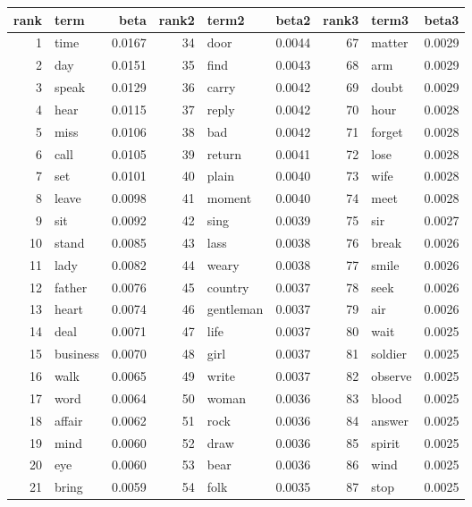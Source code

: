 \begin{table}[ht]
\centering
\begin{tabular}{rlrrlrrlr}
  \hline
rank & term & beta & rank2 & term2 & beta2 & rank3 & term3 & beta3 \\ 
  \hline
1 & time & 0.0167 & 34 & door & 0.0044 & 67 & matter & 0.0029 \\ 
  2 & day & 0.0151 & 35 & find & 0.0043 & 68 & arm & 0.0029 \\ 
  3 & speak & 0.0129 & 36 & carry & 0.0042 & 69 & doubt & 0.0029 \\ 
  4 & hear & 0.0115 & 37 & reply & 0.0042 & 70 & hour & 0.0028 \\ 
  5 & miss & 0.0106 & 38 & bad & 0.0042 & 71 & forget & 0.0028 \\ 
  6 & call & 0.0105 & 39 & return & 0.0041 & 72 & lose & 0.0028 \\ 
  7 & set & 0.0101 & 40 & plain & 0.0040 & 73 & wife & 0.0028 \\ 
  8 & leave & 0.0098 & 41 & moment & 0.0040 & 74 & meet & 0.0028 \\ 
  9 & sit & 0.0092 & 42 & sing & 0.0039 & 75 & sir & 0.0027 \\ 
  10 & stand & 0.0085 & 43 & lass & 0.0038 & 76 & break & 0.0026 \\ 
  11 & lady & 0.0082 & 44 & weary & 0.0038 & 77 & smile & 0.0026 \\ 
  12 & father & 0.0076 & 45 & country & 0.0037 & 78 & seek & 0.0026 \\ 
  13 & heart & 0.0074 & 46 & gentleman & 0.0037 & 79 & air & 0.0026 \\ 
  14 & deal & 0.0071 & 47 & life & 0.0037 & 80 & wait & 0.0025 \\ 
  15 & business & 0.0070 & 48 & girl & 0.0037 & 81 & soldier & 0.0025 \\ 
  16 & walk & 0.0065 & 49 & write & 0.0037 & 82 & observe & 0.0025 \\ 
  17 & word & 0.0064 & 50 & woman & 0.0036 & 83 & blood & 0.0025 \\ 
  18 & affair & 0.0062 & 51 & rock & 0.0036 & 84 & answer & 0.0025 \\ 
  19 & mind & 0.0060 & 52 & draw & 0.0036 & 85 & spirit & 0.0025 \\ 
  20 & eye & 0.0060 & 53 & bear & 0.0036 & 86 & wind & 0.0025 \\ 
  21 & bring & 0.0059 & 54 & folk & 0.0035 & 87 & stop & 0.0025 \\ 

\end{tabular}
\end{table}
